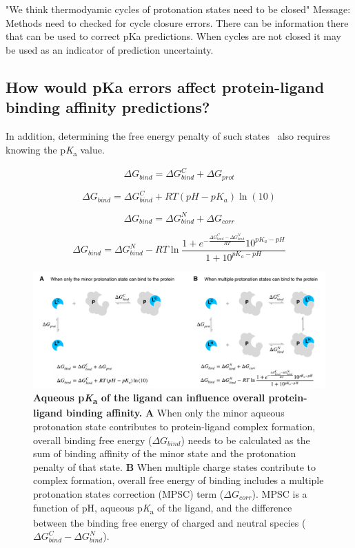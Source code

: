 \documentclass[9pt,lineno,final]{elife}
\newcommand{\pKa}{p\textit{K}\textsubscript{a}}
\begin{document}
"We think thermodyamic cycles of protonation states need to be closed"
Message: Methods need to checked for cycle closure errors.
There can be information there that can be used to correct pKa predictions.
When cycles are not closed it may be used as an indicator of prediction uncertainty.

\subsection{How would pKa errors affect protein-ligand binding affinity predictions?}
In addition, determining the free energy penalty of such states~\citep{deOliveira:2019:J.Chem.TheoryComput.} also requires knowing the \pKa{} value. 



$$ \Delta G_{bind} =\Delta G_{bind}^{C} + \Delta G_{prot}$$  

$$ \Delta G_{bind} =\Delta G_{bind}^{C} + RT(pH - pK_a) \ln{(10)}$$

$$ \Delta G_{bind} =\Delta G_{bind}^{N} + \Delta G_{corr}$$  

$$ \Delta G_{bind} =\Delta G_{bind}^{N} - RT\ln{\frac{1 + e^{-\frac{\Delta G_{bind}^{C} - \Delta G_{bind}^{N}}{RT}}10^{pK_a - pH}}{1 + 10^{pK_a - pH}}} $$  


\begin{figure}
\centering
\includegraphics[width=1.0\linewidth]{figures/pKa-effects-on-protein-ligand-binding.pdf}
\caption{ {\bf Aqueous \pKa{} of the ligand can influence overall protein-ligand binding affinity.} {\bf A} When only the minor aqueous protonation state contributes to protein-ligand complex formation, overall binding free energy ($\Delta G_{bind}$) needs to be calculated as the sum of binding affinity of the minor state and the protonation penalty of that state. {\bf B} When multiple charge states contribute to complex formation, overall free energy of binding includes a multiple protonation states correction (MPSC) term ($\Delta G_{corr}$). MPSC is a function of pH, aqueous \pKa{} of the ligand, and the difference between the binding free energy of charged and neutral species ($\Delta G_{bind}^{C} - \Delta G_{bind}^{N}$).
}
\label{fig:pKa-effects-on-protein-ligand-binding}
\end{figure}
\end{document}

